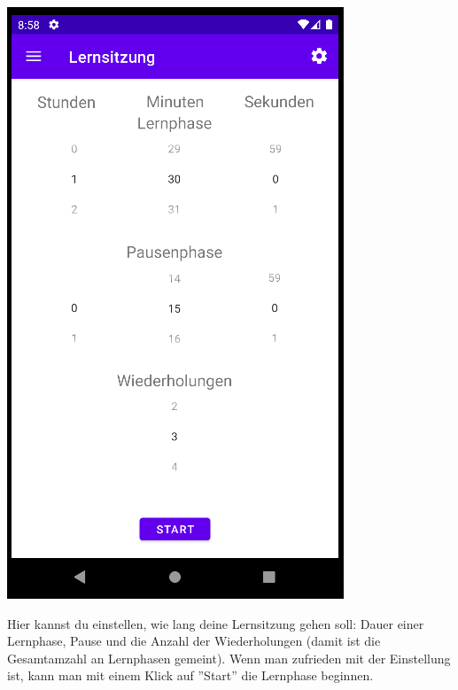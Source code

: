 \documentclass{article}
\begin{document}
\begin{center}
    \includegraphics[scale=0.6]{learn_start.png}
\end{center}
Hier kannst du einstellen, wie lang deine Lernsitzung gehen soll: Dauer einer Lernphase, Pause und die Anzahl der Wiederholungen (damit ist die Gesamtamzahl an Lernphasen gemeint). Wenn man zufrieden mit der Einstellung ist, kann man mit einem Klick auf ''Start'' die Lernphase beginnen. 
\end{document}
